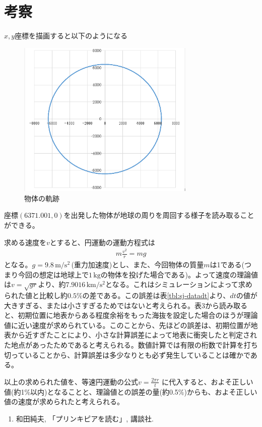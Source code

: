\documentclass[11pt,b5paper,papersize,dvipdfmx]{jsbook}
\begin{document}
\section{考察}
$x,y$座標を描画すると以下のようになる
\begin{figure}[H]
    \centering
    \includegraphics[height=7.5cm]{saijo/img/kiseki.PNG}
    \caption{物体の軌跡}
\end{figure}
座標$(6371.001,0)$を出発した物体が地球の周りを周回する様子を読み取ることができる。\par
求める速度を$v$とすると、円運動の運動方程式は
\begin{align}
    m\frac{v^2}{r} = mg
\end{align}
となる。$g=9.8\,\mathrm{m/s^2}$\,(重力加速度)とし、また、今回物体の質量$m$は1である(つまり今回の想定は地球上で$1\,\mathrm{kg}$の物体を投げた場合である)。よって速度の理論値は$v=\sqrt{gr}$より、約$7.9016\,\mathrm{km/s^2}$となる。これはシミュレーションによって求められた値と比較し約$0.5\%$の差である。この誤差は表\ref{tbl:sj-datadt}より、$dt$の値が大きすぎる、または小さすぎるためではないと考えられる。表3から読み取ると、初期位置に地表からある程度余裕をもった海抜を設定した場合のほうが理論値に近い速度が求められている。このことから、先ほどの誤差は、初期位置が地表から近すぎたことにより、小さな計算誤差によって地表に衝突したと判定された地点があったためであると考えられる。数値計算では有限の桁数で計算を打ち切っていることから、計算誤差は多少なりとも必ず発生していることは確かである。\par
以上の求められた値を、等速円運動の公式$v = \frac{2\pi r}{t}$ に代入すると、およそ正しい値(約1\%以内)となることと、理論値との誤差の量(約0.5\%)からも、およそ正しい値の速度が求められたと考えられる。


\sanko
\begin{enumerate}
\item 和田純夫, 「プリンキピアを読む」, 講談社.
\end{enumerate}
\end{document}
